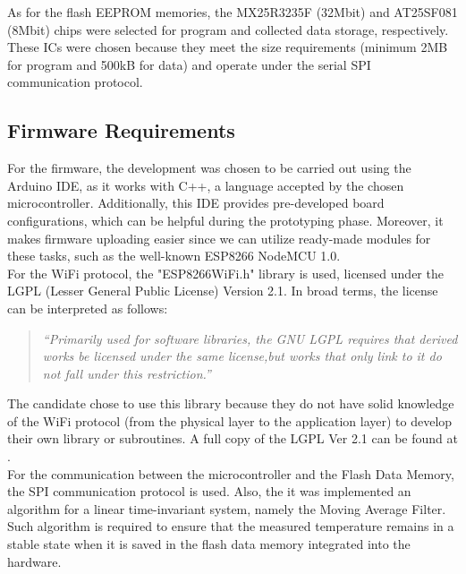 As for the flash EEPROM memories, the MX25R3235F (32Mbit) and AT25SF081 (8Mbit) chips were selected for program and 
collected data storage, respectively. These ICs were chosen because they meet the size requirements (minimum 2MB for program and 
500kB for data) and operate under the serial SPI communication protocol.


\subsection{Firmware Requirements}\label{01Sub:FirmwareRequirements}

For the firmware, the development was chosen to be carried out using the Arduino IDE, as it works with C++,
a language accepted by the chosen microcontroller. Additionally, this IDE provides pre-developed board configurations,
which can be helpful during the prototyping phase. Moreover, it makes firmware uploading easier since we can utilize ready-made
modules for these tasks, such as the well-known ESP8266 NodeMCU 1.0.\\ 

For the WiFi protocol, the "ESP8266WiFi.h" library is used, licensed under the LGPL (Lesser General Public License) Version 2.1.
In broad terms, the license can be interpreted as follows: \\ 

\begin{flushright}
    \begin{quote}
        \textit{``Primarily used for software libraries, the GNU LGPL requires that derived works be licensed under the same 
        license,but works that only link to it do not fall under this restriction.''}
\end{quote}
\end{flushright}


The candidate chose to use this library because they do not have solid knowledge of the WiFi protocol (from the physical layer to 
the application layer) to develop their own library or subroutines. A full copy of the LGPL Ver 2.1 can be found at \cite{LGPL}. \\



For the communication between the microcontroller and the Flash Data Memory, the SPI communication protocol is used.
Also, the  it was implemented an algorithm for a linear time-invariant system, namely the Moving Average Filter. Such 
algorithm is required to ensure that the measured temperature remains in a stable state when it is saved in the flash data memory 
integrated into the hardware.










